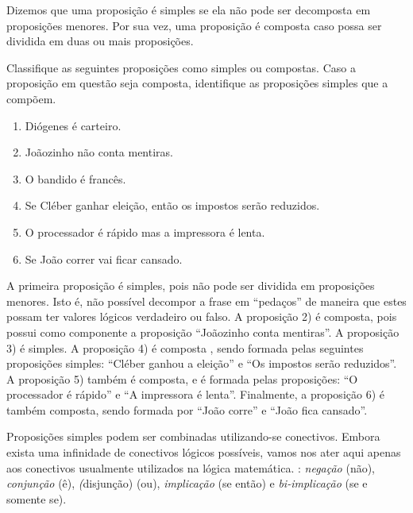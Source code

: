 \begin{Definition}
   Dizemos que uma proposi\c{c}\~ao \'e simples se ela n\~ao pode
   ser decomposta em proposi\c{c}\~oes menores. Por sua vez, uma
   proposi\c{c}\~ao \'e composta caso
   possa ser dividida em duas ou mais proposi\c{c}\~oes.
\end{Definition}
\begin{Example}
  Classifique as seguintes proposi\c{c}\~oes como simples ou compostas. Caso a proposi\c{c}\~ao em quest\~ao seja composta, identifique
  as proposi\c{c}\~oes simples que a comp\~oem.
  \begin{enumerate}
    \item Di\'ogenes \'e carteiro.
    \item Jo\~aozinho n\~ao conta mentiras.
    \item O bandido \'e franc\^es.
    \item Se Cl\'eber ganhar elei\c{c}\~ao, ent\~ao os impostos ser\~ao reduzidos.
    \item O processador \'e r\'apido mas a impressora \'e lenta.
    \item Se Jo\~ao correr vai ficar cansado.
  \end{enumerate}
  A primeira proposi\c{c}\~ao \'e simples, pois n\~ao pode ser dividida em proposi\c{c}\~oes menores. Isto \'e, n\~ao poss\'ivel decompor a frase
  em ``peda\c{c}os'' de maneira que estes possam ter valores l\'ogicos verdadeiro ou falso. A proposi\c{c}\~ao 2) \'e composta, pois possui como
  componente a proposi\c{c}\~ao ``Jo\~aozinho conta mentiras''. A proposi\c{c}\~ao 3) \'e simples. A proposi\c{c}\~ao 4) \'e composta , sendo
  formada pelas seguintes proposi\c{c}\~oes simples: ``Cl\'eber ganhou a elei\c{c}\~ao'' e ``Os impostos ser\~ao reduzidos''. A proposi\c{c}\~ao 5)
  tamb\'em \'e composta, e \'e formada pelas proposi\c{c}\~oes: ``O processador \'e r\'apido'' e ``A impressora \'e lenta''. Finalmente, a
  proposi\c{c}\~ao 6) \'e tamb\'em composta, sendo formada por ``Jo\~ao corre'' e ``Jo\~ao fica cansado''.
\end{Example}

Proposi\c{c}\~oes simples podem ser combinadas utilizando-se conectivos. Embora exista uma infinidade de conectivos l\'ogicos possíveis, vamos nos ater aqui apenas aos conectivos usualmente utilizados na lógica matem\'atica. : \textit{negação} (não), \textit{conjunção} (ê), \textit(disjunção) (ou), \textit{implicação} (se então) e \textit{bi-implicação} (se e somente se).


